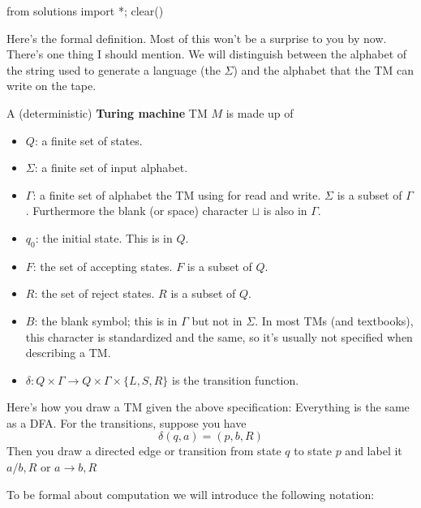 \newcommand\BOT{\operatorname{\text{\texttt{\$}}}} %
\newcommand\EOT{\operatorname{\text{\texttt{!}}}} %

\begin{python0}
from solutions import *; clear()
\end{python0}

Here's the formal definition. Most of this won't be a surprise to
you by now. There's one thing I should mention. We will distinguish
between the alphabet of the string used to generate a language (the
$\Sigma$) and the alphabet that the TM can write on the tape.

\begin{defn}
A (deterministic) \textbf{Turing machine} TM $M$ is made up of
\begin{itemize}
 \item $Q$: a finite set of states.
 \item $\Sigma$: a finite set of input alphabet.
 \item $\Gamma$: a finite set of alphabet the TM using for read and write.
 $\Sigma$ is a subset of $\Gamma$.
 Furthermore the blank (or space) character $\sqcup$ is also in $\Gamma$.
 \item $q_0$: the initial state. This is in $Q$.
 \item $F$: the set of accepting states. $F$ is a subset of $Q$.
 \item $R$: the set of reject states. $R$ is a subset of $Q$.
 \item $B$: the blank symbol; this is in $\Gamma$ but not in $\Sigma$.
 In most TMs (and textbooks), this character is standardized and the same, 
 so it's usually not specified when describing a TM.
 \item $\delta : Q \times \Gamma \rightarrow Q 
\times \Gamma \times \{L, S, R\}$ is the transition function.
\end{itemize}
\end{defn}


Here's how you draw a TM given the above specification: Everything
is the same as a DFA. For the transitions, suppose you have
\[
 \delta(q, a) = (p, b, R)
\]
Then you draw a directed edge or transition from state $q$ to
state $p$ and label it $a/b, R$ or $a \rightarrow b, R$

To be formal about computation we will introduce the following
notation:

